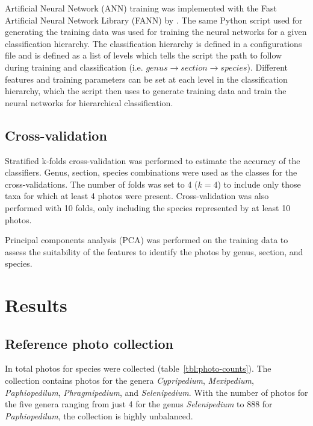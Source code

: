\documentclass[twocolumn]{bmcart}
\begin{document}
Artificial Neural Network (ANN) training was implemented with the Fast Artificial Neural Network Library (FANN) by \cite{Nissen2003}. The same Python script used for generating the training data was used for training the neural networks for a given classification hierarchy. The classification hierarchy is defined in a configurations file and is defined as a list of levels which tells the script the path to follow during training and classification (i.e. $genus \rightarrow section \rightarrow species$). Different features and training parameters can be set at each level in the classification hierarchy, which the script then uses to generate training data and train the neural networks for hierarchical classification.

\subsection{Cross-validation}

Stratified k-folds cross-validation was performed to estimate the accuracy of the classifiers. Genus, section, species combinations were used as the classes for the cross-validations. The number of folds was set to 4 ($k=4$) to include only those taxa for which at least 4 photos were present. Cross-validation was also performed with 10 folds, only including the species represented by at least 10 photos.

Principal components analysis (PCA) was performed on the training data to assess the suitability of the features to identify the photos by genus, section, and species.

\section{Results}
\label{sect:results}

\subsection{Reference photo collection}

In total {\PhotoCount} photos for {\SpeciesCount} species were collected (table~\ref{tbl:photo-counts}). The collection contains photos for the genera \textit{Cypripedium}, \textit{Mexipedium}, \textit{Paphiopedilum}, \textit{Phragmipedium}, and \textit{Selenipedium}. With the number of photos for the five genera ranging from just 4 for the genus \textit{Selenipedium} to 888 for \textit{Paphiopedilum}, the collection is highly unbalanced.
\end{document}
